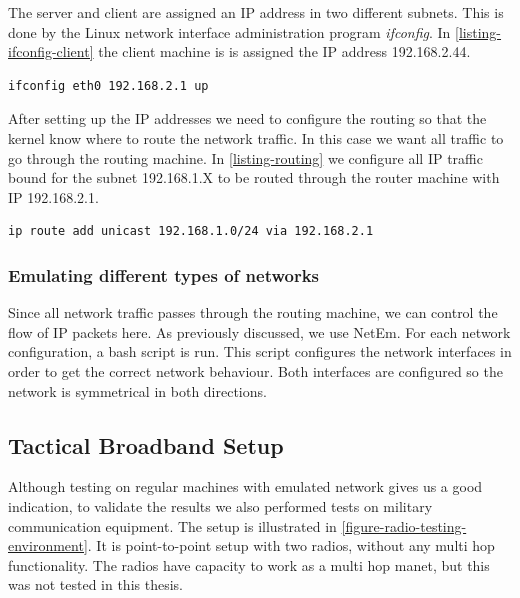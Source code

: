 The server and client are assigned an IP address in two different subnets.
This is done by the Linux network interface administration program
\textit{ifconfig}. In \cref{listing-ifconfig-client} the client machine is is
assigned the IP address 192.168.2.44.

\begin{lstlisting}[frame=single, caption="Configuring a network interface of the router", label=listing-ifconfig-client]
ifconfig eth0 192.168.2.1 up
\end{lstlisting}

After setting up the IP addresses we need to configure the routing so that the
kernel know where to route the network traffic. In this case we want all
traffic to go through the routing machine. In \cref{listing-routing} we
configure all IP traffic bound for the subnet 192.168.1.X to be routed through
the router machine with IP 192.168.2.1.

\begin{lstlisting}[frame=single, caption="Configuring routing rules for the client", label=listing-routing]
ip route add unicast 192.168.1.0/24 via 192.168.2.1
\end{lstlisting}

\subsubsection{Emulating different types of networks}

Since all network traffic passes through the routing machine, we can control
the flow of IP packets here. As previously discussed, we use NetEm.  For each
network configuration, a bash script is run. This script configures the
network interfaces in order to get the correct network behaviour. Both
interfaces are configured so the network is symmetrical in both directions.

\subsection{Tactical Broadband Setup}

Although testing on regular machines with emulated network gives us a good
indication, to validate the results we also performed tests on military
communication equipment. The setup is illustrated in
\cref{figure-radio-testing-environment}. It is point-to-point setup with two
radios, without any multi hop functionality. The radios have capacity to work as
a multi hop \gls{manet}, but this was not tested in this thesis.

